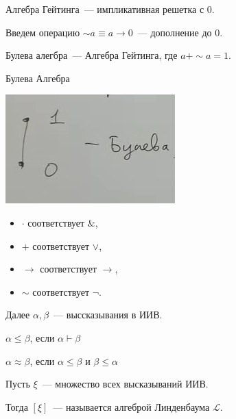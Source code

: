 \begin{definition}
    Алгебра Гейтинга~--- импликативная решетка с 0.
\end{definition}

\begin{definition}
    Введем операцию $\sim a \equiv a \to 0$~--- дополнение до 0.
\end{definition}
\begin{definition}
    Булева алегбра~--- Алгебра Гейтинга, где $a + \sim a = 1$.
\end{definition}

\begin{example}
    Булева Алгебра

    \includegraphics[scale=0.8]{img/bool_algebra}

    \begin{itemize}
        \item $\cdot$ соответствует $\&$,
        \item $+$ соответствует $\vee$,
        \item $\to$ соответствует $\to$,
        \item $\sim$ соответствует $\neg$.
    \end{itemize}
\end{example}

Далее $\alpha, \beta$~--- выссказывания в ИИВ.

\begin{definition}
    $\alpha \leqslant \beta$, если $\alpha \vdash \beta$
\end{definition}

\begin{definition}
    $\alpha \approx \beta$, если $\alpha \leqslant \beta$ и $\beta \leqslant \alpha$
\end{definition}

\begin{definition}
    Пусть $\xi$~--- множество всех высказываний ИИВ.

    Тогда $[ \xi ]$~--- называется алгеброй Линденбаума $\mathcal{L}$.
\end{definition}


